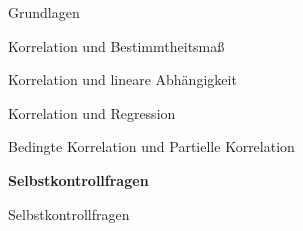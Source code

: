 \documentclass[
  8pt,
  ignorenonframetext,
]{beamer}
\begin{document}
\begin{frame}{}
\protect\hypertarget{section-8}{}
\vfill
\large

Grundlagen

Korrelation und Bestimmtheitsmaß

Korrelation und lineare Abhängigkeit

Korrelation und Regression

Bedingte Korrelation und Partielle Korrelation

\textbf{Selbstkontrollfragen}

\vfill
\end{frame}

\begin{frame}{Selbstkontrollfragen}
\protect\hypertarget{selbstkontrollfragen}{}
\tiny
\justifying


\end{frame}
\end{document}
